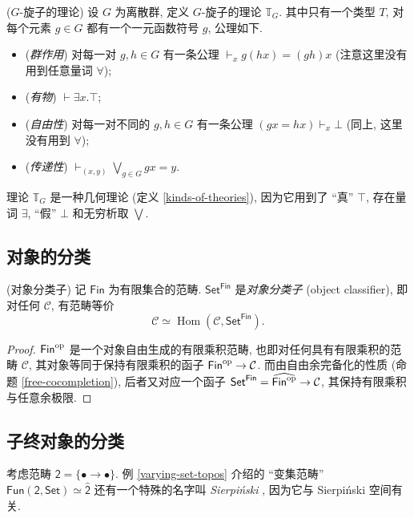 \begin{definition}
	{($G$-旋子的理论)}
	设 $G$ 为离散群, 定义 $G$-旋子的理论 $\mathbb T_G$.
	其中只有一个类型 $T$, 对每个元素 $g\in G$ 都有一个一元函数符号 $g$, 公理如下.
	\begin{itemize}
		\item (\emph{群作用}) 对每一对 $g,h\in G$ 有一条公理 $\vdash_x g(hx)=(gh)x$ (注意这里没有用到任意量词 $\forall$);
		\item (\emph{有物}) $\vdash \exists x. \top$;
		\item (\emph{自由性}) 对每一对不同的 $g,h\in G$ 有一条公理 $(gx=hx)\vdash_x \bot$ (同上, 这里没有用到 $\forall$);
		\item (\emph{传递性}) $\displaystyle\vdash_{(x,y)}\bigvee_{g\in G}gx=y$.
	\end{itemize}
\end{definition}

理论 $\mathbb T_G$ 是一种几何理论 (定义 \ref{kinds-of-theories}), 因为它用到了 ``真'' $\top$, 存在量词 $\exists$, ``假'' $\bot$ 和无穷析取 $\bigvee$.

\subsection{对象的分类\topos}

\begin{prop}
	{(对象分类子)}
	记 $\mathsf {Fin}$ 为有限集合的范畴. \topos{} $\mathsf {Set}^{\mathsf {Fin}}$ 是\emph{对象分类子} (object classifier),
	即对任何\topos{} $\mathcal C$, 有范畴等价
	$$
	\mathcal C\simeq \operatorname{Hom}(\mathcal C,\mathsf {Set}^{\mathsf {Fin}}).
	$$
	
\end{prop}
\begin{proof}
	$\mathsf {Fin}^{\text{op}}$ 是一个对象自由生成的有限乘积范畴, 也即对任何具有有限乘积的范畴 $\mathcal C$, 其对象等同于保持有限乘积的函子 $\mathsf {Fin}^{\text{op}}\to \mathcal C$. 而由自由余完备化的性质 (命题 \ref{free-cocompletion}), 后者又对应一个函子 $\mathsf {Set}^{\mathsf {Fin}}=\widehat {\mathsf {Fin}^{\text{op}}} \to \mathcal C$, 其保持有限乘积与任意余极限.
\end{proof}


\subsection{子终对象的分类\topos}

考虑范畴 $\mathsf 2 = \{\bullet\longrightarrow\bullet\}$. 例 \ref{varying-set-topos} 介绍的 ``变集范畴'' $\mathsf {Fun}(\mathsf {2},\mathsf {Set})\simeq\widehat {\mathsf {2}}$ 还有一个特殊的名字叫 \emph{Sierpi\'nski \topos{}}, 因为它与 Sierpi\'nski 空间有关.

